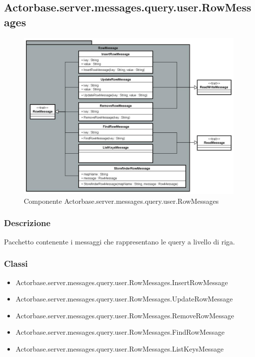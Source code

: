 \documentclass[a4paper]{article}
\begin{document}
		\subsection{Actorbase.server.messages.query.user.RowMessages}
		
			\begin{figure}[H]
				\centering
				\includegraphics[width=\textwidth]{ST/Server/rowMessagesLevel.jpg}
				\caption{Componente Actorbase.server.messages.query.user.RowMessages}
			\end{figure}
			
			\subsubsection{Descrizione}
				Pacchetto contenente i messaggi che rappresentano le query a livello di riga.
				
			\subsubsection{Classi}
				\begin{itemize}
					\item Actorbase.server.messages.query.user.RowMessages.InsertRowMessage
					\item Actorbase.server.messages.query.user.RowMessages.UpdateRowMessage
					\item Actorbase.server.messages.query.user.RowMessages.RemoveRowMessage
					\item Actorbase.server.messages.query.user.RowMessages.FindRowMessage
					\item Actorbase.server.messages.query.user.RowMessages.ListKeysMessage
				\end{itemize}
				
\end{document}

